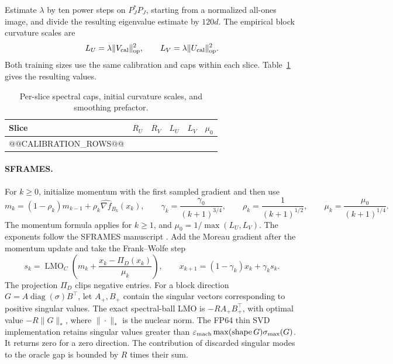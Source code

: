 \documentclass[11pt]{article}
\begin{document}
Estimate \(\lambda\) by ten power steps on \(P_J^\ast P_J\), starting from a normalized all-ones image, and divide the resulting eigenvalue estimate by \(120d\). The empirical block curvature scales are
\[
  L_U=\lambda\|V_{\rm cal}\|_{\rm op}^2,\qquad
  L_V=\lambda\|U_{\rm cal}\|_{\rm op}^2 .
\]
Both training sizes use the same calibration and caps within each slice. Table~\ref{tab:ct-curvature} gives the resulting values.

\begin{table}[htbp]
  \centering
  \caption{Per-slice spectral caps, initial curvature scales, and smoothing prefactor.}
  \label{tab:ct-curvature}
  \begin{tabular}{@{}lrrrrr@{}}
    \toprule
    Slice & \(R_U\) & \(R_V\) & \(L_U\) & \(L_V\) & \(\mu_0\) \\
    \midrule
@@CALIBRATION_ROWS@@
    \bottomrule
  \end{tabular}
\end{table}

\paragraph{SFRAMES.}
For \(k\ge0\), initialize momentum with the first sampled gradient and then use
\[
  m_k=(1-\rho_k)m_{k-1}+\rho_k\widehat{\nabla f}_{B_k}(x_k),
  \qquad
  \gamma_k=\frac{\gamma_0}{(k+1)^{3/4}},\qquad
  \rho_k=\frac{1}{(k+1)^{1/2}},\qquad
  \mu_k=\frac{\mu_0}{(k+1)^{1/4}} .
\]
The momentum formula applies for \(k\ge1\), and \(\mu_0=1/\max(L_U,L_V)\). The exponents follow the SFRAMES manuscript \cite{sframes}. Add the Moreau gradient after the momentum update and take the Frank--Wolfe step
\[
  s_k=\operatorname{LMO}_C\left(m_k+
             \frac{x_k-\Pi_D(x_k)}{\mu_k}\right),
  \qquad
  x_{k+1}=(1-\gamma_k)x_k+\gamma_k s_k .
\]
The projection \(\Pi_D\) clips negative entries. For a block direction
\(G=A\operatorname{diag}(\sigma)B^\top\), let \(A_+,B_+\) contain the
singular vectors corresponding to positive singular values. The exact
spectral-ball LMO is \(-R A_+B_+^\top\), with optimal value
\(-R\|G\|_*\), where \(\|\cdot\|_*\) is the nuclear norm. The FP64 thin SVD
implementation retains singular values greater than
\(\varepsilon_{\rm mach}\max(\operatorname{shape}G)\sigma_{\max}(G)\).
It returns zero for a zero direction. The contribution of discarded
singular modes to the oracle gap is bounded by \(R\) times their sum.
\end{document}
